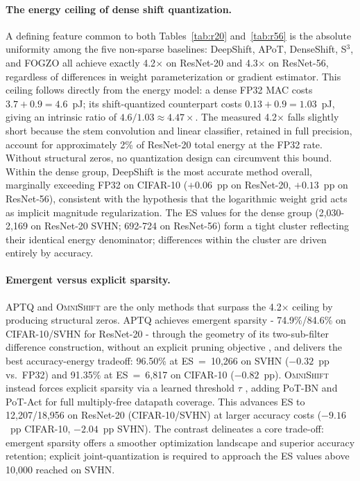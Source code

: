 \documentclass[12pt]{article}
\newcommand{\omnishift}{\textsc{OmniShift}}
\begin{document}
\paragraph{The energy ceiling of dense shift quantization.} A defining feature common to both Tables~\ref{tab:r20} and~\ref{tab:r56} is the absolute uniformity among the five non-sparse baselines: DeepShift, APoT, DenseShift, S$^3$, and FOGZO all achieve exactly 4.2$\times$ on ResNet-20 and 4.3$\times$ on ResNet-56, regardless of differences in weight parameterization or gradient estimator. This ceiling follows directly from the energy model: a dense FP32 MAC costs $3.7 + 0.9 = 4.6$~pJ; its shift-quantized counterpart costs $0.13 + 0.9 = 1.03$~pJ, giving an intrinsic ratio of $4.6/1.03 \approx 4.47\times$. The measured 4.2$\times$ falls slightly short because the stem convolution and linear classifier, retained in full precision, account for approximately 2\% of ResNet-20 total energy at the FP32 rate. Without structural zeros, no quantization design can circumvent this bound. Within the dense group, DeepShift is the most accurate method overall, marginally exceeding FP32 on CIFAR-10 ($+0.06$~pp on ResNet-20, $+0.13$~pp on ResNet-56), consistent with the hypothesis that the logarithmic weight grid acts as implicit magnitude regularization. The ES values for the dense group (2,030-2,169 on ResNet-20 SVHN; 692-724 on ResNet-56) form a tight cluster reflecting their identical energy denominator; differences within the cluster are driven entirely by accuracy.

\paragraph{Emergent versus explicit sparsity.} APTQ and \omnishift{} are the only methods that surpass the 4.2$\times$ ceiling by producing structural zeros. APTQ achieves emergent sparsity - 74.9\%/84.6\% on CIFAR-10/SVHN for ResNet-20 - through the geometry of its two-sub-filter difference construction, without an explicit pruning objective \cite{frankle2019lottery,han2016deepcomp}, and delivers the best accuracy-energy tradeoff: 96.50\% at ES~=~10,266 on SVHN ($-0.32$~pp vs.\ FP32) and 91.35\% at ES~=~6,817 on CIFAR-10 ($-0.82$~pp). \omnishift{} instead forces explicit sparsity via a learned threshold $\tau$ \cite{louizos2018l0,molchanov2017pruning}, adding PoT-BN and PoT-Act for full multiply-free datapath coverage. This advances ES to 12,207/18,956 on ResNet-20 (CIFAR-10/SVHN) at larger accuracy costs ($-9.16$~pp CIFAR-10, $-2.04$~pp SVHN). The contrast delineates a core trade-off: emergent sparsity offers a smoother optimization landscape and superior accuracy retention; explicit joint-quantization is required to approach the ES values above 10,000 reached on SVHN.
\end{document}
